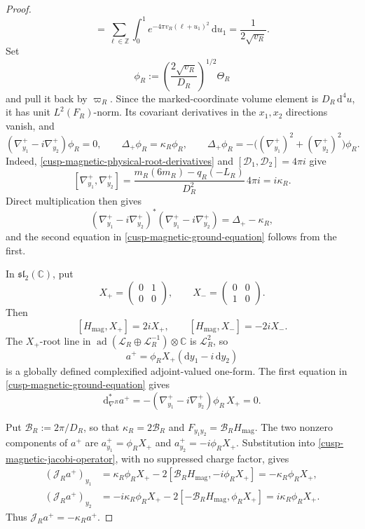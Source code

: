 \begin{proof}
\[ =\sum_{\ell\in\mathbb Z}\int_0^1
   e^{-4\pi v_R(\ell+u_1)^2}\,\mathrm du_1
 =\frac1{2\sqrt{v_R}}.
\]
Set
\[
 \phi_R:=\left(\frac{2\sqrt{v_R}}{D_R}\right)^{1/2}\Theta_R
\]
and pull it back by \(\varpi_R\).  Since the marked-coordinate volume
element is \(D_R\,\mathrm d^4u\), it has unit \(L^2(F_R)\)-norm.  Its
covariant derivatives in the \(x_1,x_2\) directions vanish, and
\begin{equation}
 (\nabla_{y_1}^+-i\nabla_{y_2}^+)\phi_R=0,
 \qquad
 \Delta_+\phi_R=\kappa_R\phi_R,
 \qquad
 \Delta_+\phi_R
 =-\bigl((\nabla_{y_1}^+)^2+(\nabla_{y_2}^+)^2\bigr)\phi_R.
 \label{cusp-magnetic-ground-equation}
\end{equation}
Indeed, \cref{cusp-magnetic-physical-root-derivatives} and
\([\mathcal D_1,\mathcal D_2]=4\pi i\) give
\[
 [\nabla_{y_1}^+,\nabla_{y_2}^+]
 =\frac{m_R(6m_R)-q_R(-L_R)}{D_R^2}\,4\pi i
 =i\kappa_R.
\]
Direct multiplication then gives
\[
 (\nabla_{y_1}^+-i\nabla_{y_2}^+)^*
 (\nabla_{y_1}^+-i\nabla_{y_2}^+)=\Delta_+-\kappa_R,
\]
and the second equation in \eqref{cusp-magnetic-ground-equation} follows
from the first.

In \(\mathfrak{sl}_2(\mathbb C)\), put
\[
 X_+=\begin{pmatrix}0&1\\0&0\end{pmatrix},
 \qquad
 X_-=\begin{pmatrix}0&0\\1&0\end{pmatrix}.
\]
Then
\[
 [H_{\mathrm{mag}},X_+]=2iX_+,
 \qquad
 [H_{\mathrm{mag}},X_-]=-2iX_-.
\]
The \(X_+\)-root line in
\(\operatorname{ad}(\mathscr L_R\oplus\mathscr L_R^{-1})
 \otimes\mathbb C\) is \(\mathscr L_R^2\),
so
\[
 a^+=\phi_RX_+(\mathrm dy_1-i\,\mathrm dy_2)
\]
is a globally defined complexified adjoint-valued one-form.  The first
equation in \eqref{cusp-magnetic-ground-equation} gives
\[
 \mathrm d_{\nabla^R}^*a^+
 =-(\nabla_{y_1}^+-i\nabla_{y_2}^+)\phi_R\,X_+=0.
\]

Put \(\mathcal B_R:=2\pi/D_R\), so that
\(\kappa_R=2\mathcal B_R\) and
\(F_{y_1y_2}=\mathcal B_RH_{\mathrm{mag}}\).  The two nonzero components
of \(a^+\) are \(a_{y_1}^+=\phi_RX_+\) and
\(a_{y_2}^+=-i\phi_RX_+\).  Substitution into
\eqref{cusp-magnetic-jacobi-operator}, with no suppressed charge factor,
gives
\begin{align*}
 (\mathcal J_Ra^+)_{y_1}
 &=\kappa_R\phi_RX_+
   -2[\mathcal B_RH_{\mathrm{mag}},-i\phi_RX_+]
  =-\kappa_R\phi_RX_+,\\
 (\mathcal J_Ra^+)_{y_2}
 &=-i\kappa_R\phi_RX_+
   -2[-\mathcal B_RH_{\mathrm{mag}},\phi_RX_+]
  =i\kappa_R\phi_RX_+.
\end{align*}
Thus \(\mathcal J_Ra^+=-\kappa_Ra^+\).


\end{proof}
